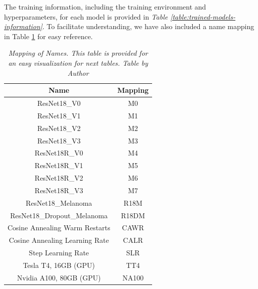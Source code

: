 The training information, including the training environment and hyperparameters, for each model is provided in \textit{Table \ref{table:trained-models-information}}. To facilitate understanding, we have also included a name mapping in Table \ref{table:mapping-names} for easy reference.

\begin{table}[H]
\centering
\begin{tabular}{cc}
    \toprule
\textbf{Name} & \textbf{Mapping} \\  \midrule
ResNet18\_V0 & M0 \\
ResNet18\_V1 & M1 \\
ResNet18\_V2 & M2 \\
ResNet18\_V3 & M3 \\
ResNet18R\_V0  & M4 \\
ResNet18R\_V1  & M5 \\
ResNet18R\_V2 & M6 \\
ResNet18R\_V3  & M7 \\
ResNet18\_Melanoma & R18M \\
ResNet18\_Dropout\_Melanoma & R18DM \\
Cosine Annealing Warm Restarts & CAWR \\
Cosine Annealing Learning Rate & CALR \\
Step Learning Rate & SLR \\
Tesla T4, 16GB (GPU) & TT4 \\
Nvidia A100, 80GB (GPU) & NA100 \\ \bottomrule
\end{tabular}
\caption[Mapping of Names.]
  {\textit{Mapping of Names. This table is provided for an easy visualization for next tables.
  Table by Author}}
{\label{table:mapping-names}}
\end{table}

\newpage

